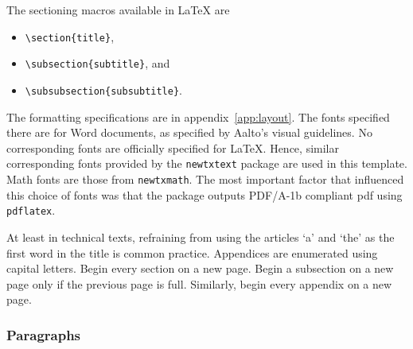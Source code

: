 \documentclass[english, 12pt, a4paper, biz, utf8, a-2b, online]{aaltothesis}
\begin{document}
The sectioning macros available in \LaTeX{} are 
\begin{itemize}
	\setlength{\itemsep}{0pt}
	\item[] \verb+\section{title}+,
	\item[] \verb+\subsection{subtitle}+, and
	\item[] \verb+\subsubsection{subsubtitle}+.
\end{itemize}

The formatting specifications are in appendix~\ref{app:layout}. The fonts 
specified there are for Word documents, as specified by Aalto's visual 
guidelines. No corresponding fonts are officially specified for \LaTeX{}. Hence,
similar corresponding fonts provided by the \verb+newtxtext+ package are used in
this template. Math fonts are those from \verb+newtxmath+. The most important 
factor that influenced this choice of fonts was that the package outputs 
PDF/A-1b compliant pdf using \texttt{pdflatex}.

At least in technical texts, refraining from using the articles ‘a’ and ‘the’ as
the first word in the title is common practice. Appendices are enumerated using 
capital letters. Begin every section on a new page. Begin a subsection on a new 
page only if the previous page is full. Similarly, begin every appendix on a new
page.

\subsubsection{Paragraphs}
\end{document}
